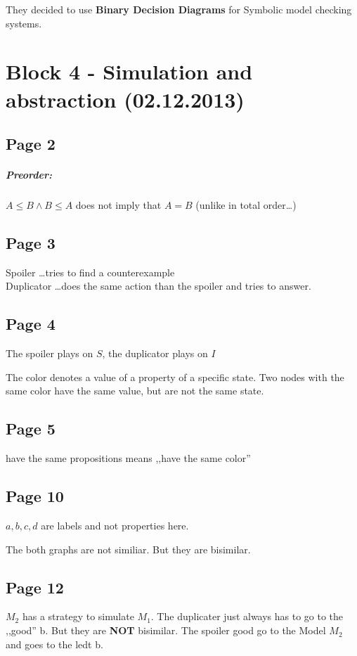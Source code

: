 \documentclass[a4paper]{article}
\begin{document}
They decided to use \textbf{Binary Decision Diagrams} for Symbolic model
checking systems.

\section{Block 4 - Simulation and abstraction (02.12.2013)}
\subsection{Page 2}
\subparagraph{Preorder:} $A \leq B \wedge B \leq A $ does not imply that $ A =
B$ (unlike in total order\ldots)

\subsection{Page 3}
Spoiler \ldots tries to find a counterexample\\
Duplicator \ldots does the same action than the spoiler and tries to answer.

\subsection{Page 4}
The spoiler plays on $S$, the duplicator plays on $I$

The color denotes a value of a property of a specific state. Two nodes with the
same color have the same value, but are not the same state.


\subsection{Page 5}
have the same propositions means ,,have the same color''

\subsection{Page 10}

$a,b,c,d$ are labels and not properties here.

The both graphs are not similiar. But they are bisimilar.


\subsection{Page 12}
$M_2$ has a strategy to simulate $M_1$. The duplicater
just always has to go to the ,,good'' b. But they are \textbf{NOT} bisimilar.
The spoiler good go to the Model $M_2$ and goes to the ledt b.
\end{document}
